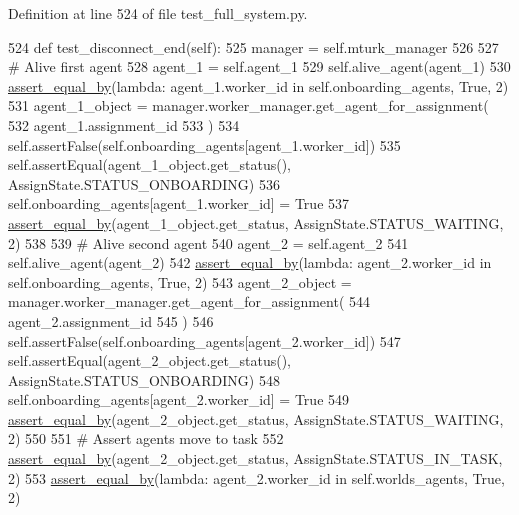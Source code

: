 Definition at line 524 of file test\+\_\+full\+\_\+system.\+py.


\begin{DoxyCode}
524     \textcolor{keyword}{def }test\_disconnect\_end(self):
525         manager = self.mturk\_manager
526 
527         \textcolor{comment}{# Alive first agent}
528         agent\_1 = self.agent\_1
529         self.alive\_agent(agent\_1)
530         \hyperlink{namespaceparlai_1_1mturk_1_1core_1_1test_1_1test__full__system_a0b463246d35658a2e422010f13dcf819}{assert\_equal\_by}(\textcolor{keyword}{lambda}: agent\_1.worker\_id \textcolor{keywordflow}{in} self.onboarding\_agents, \textcolor{keyword}{True}, 2)
531         agent\_1\_object = manager.worker\_manager.get\_agent\_for\_assignment(
532             agent\_1.assignment\_id
533         )
534         self.assertFalse(self.onboarding\_agents[agent\_1.worker\_id])
535         self.assertEqual(agent\_1\_object.get\_status(), AssignState.STATUS\_ONBOARDING)
536         self.onboarding\_agents[agent\_1.worker\_id] = \textcolor{keyword}{True}
537         \hyperlink{namespaceparlai_1_1mturk_1_1core_1_1test_1_1test__full__system_a0b463246d35658a2e422010f13dcf819}{assert\_equal\_by}(agent\_1\_object.get\_status, AssignState.STATUS\_WAITING, 2)
538 
539         \textcolor{comment}{# Alive second agent}
540         agent\_2 = self.agent\_2
541         self.alive\_agent(agent\_2)
542         \hyperlink{namespaceparlai_1_1mturk_1_1core_1_1test_1_1test__full__system_a0b463246d35658a2e422010f13dcf819}{assert\_equal\_by}(\textcolor{keyword}{lambda}: agent\_2.worker\_id \textcolor{keywordflow}{in} self.onboarding\_agents, \textcolor{keyword}{True}, 2)
543         agent\_2\_object = manager.worker\_manager.get\_agent\_for\_assignment(
544             agent\_2.assignment\_id
545         )
546         self.assertFalse(self.onboarding\_agents[agent\_2.worker\_id])
547         self.assertEqual(agent\_2\_object.get\_status(), AssignState.STATUS\_ONBOARDING)
548         self.onboarding\_agents[agent\_2.worker\_id] = \textcolor{keyword}{True}
549         \hyperlink{namespaceparlai_1_1mturk_1_1core_1_1test_1_1test__full__system_a0b463246d35658a2e422010f13dcf819}{assert\_equal\_by}(agent\_2\_object.get\_status, AssignState.STATUS\_WAITING, 2)
550 
551         \textcolor{comment}{# Assert agents move to task}
552         \hyperlink{namespaceparlai_1_1mturk_1_1core_1_1test_1_1test__full__system_a0b463246d35658a2e422010f13dcf819}{assert\_equal\_by}(agent\_2\_object.get\_status, AssignState.STATUS\_IN\_TASK, 2)
553         \hyperlink{namespaceparlai_1_1mturk_1_1core_1_1test_1_1test__full__system_a0b463246d35658a2e422010f13dcf819}{assert\_equal\_by}(\textcolor{keyword}{lambda}: agent\_2.worker\_id \textcolor{keywordflow}{in} self.worlds\_agents, \textcolor{keyword}{True}, 2)

\end{DoxyCode}
